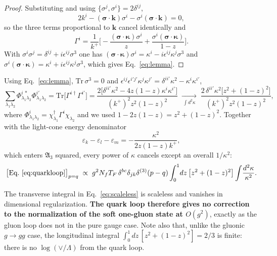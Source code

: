 \documentclass[11pt]{article}
\newcommand{\mf}{\mathfrak}
\newcommand{\eps}{\varepsilon}
\newcommand{\dg}{\dagger}
\newcommand{\dthree}{\delta^{(3)}}
\begin{document}
\begin{proof}[Proof]
Substituting and using $\{\sigma^{j},\sigma^{i}\}=2\delta^{ij}$,
\begin{equation}
2k^{i}-(\bm\sigma\!\cdot\!\bm k)\sigma^{i}-\sigma^{i}(\bm\sigma\!\cdot\!\bm k)=0,
\end{equation}
so the three terms proportional to $\bm k$ cancel identically and
\begin{equation}
\Gamma^{i}=\frac{1}{k^{+}}\Big[-\frac{(\bm\sigma\!\cdot\!\bm\kappa)\sigma^{i}}{z}
+\frac{\sigma^{i}(\bm\sigma\!\cdot\!\bm\kappa)}{1-z}\Big].
\end{equation}
With $\sigma^{i}\sigma^{j}=\delta^{ij}+i\epsilon^{ij}\sigma^{3}$ one has
$(\bm\sigma\!\cdot\!\bm\kappa)\sigma^{i}=\kappa^{i}-i\epsilon^{ij}\kappa^{j}\sigma^{3}$ and
$\sigma^{i}(\bm\sigma\!\cdot\!\bm\kappa)=\kappa^{i}+i\epsilon^{ij}\kappa^{j}\sigma^{3}$, which
gives Eq.~\eqref{eq:lemma}.
\end{proof}

\noindent
Using Eq.~\eqref{eq:lemma}, $\mathrm{Tr}\,\sigma^{3}=0$ and
$\epsilon^{ij}\epsilon^{i'j'}\kappa^{j}\kappa^{j'}=\delta^{ii'}\kappa^{2}-\kappa^{i}\kappa^{i'}$,
\begin{equation}
\sum_{\lambda_{1}\lambda_{2}}\Phi^{i\,*}_{\lambda_1\lambda_2}\Phi^{i'}_{\lambda_1\lambda_2}
=\mathrm{Tr}\big[\Gamma^{i\dg}\Gamma^{i'}\big]
=\frac{2\big[\delta^{ii'}\kappa^{2}-4z(1-z)\kappa^{i}\kappa^{i'}\big]}{(k^{+})^{2}z^{2}(1-z)^{2}}
\;\xrightarrow[\ \int d^{2}\kappa\ ]{}\;
\frac{2\,\delta^{ii'}\kappa^{2}\big[z^{2}+(1-z)^{2}\big]}{(k^{+})^{2}z^{2}(1-z)^{2}},
\end{equation}
where $\Phi^{i}_{\lambda_1\lambda_2}=\chi^{\dg}_{\lambda_1}\Gamma^{i}\chi_{\lambda_2}$ and we used
$1-2z(1-z)=z^{2}+(1-z)^{2}$. Together with the light-cone energy denominator
\begin{equation}
\eps_{k}-\eps_{l}-\eps_{m}=-\frac{\kappa^{2}}{2z(1-z)k^{+}},
\end{equation}
which enters $\mf A_{3}$ squared, every power of $\kappa$ cancels except an overall $1/\kappa^{2}$:
\begin{equation}
\big[\text{Eq.}~\eqref{eq:quarkloop}\big]_{p=q}
\;\propto\;g^{2}N_{f}T_{F}\,\delta^{bc}\delta_{jk}\dthree(p-q)
\int_{0}^{1}\!dz\,\big[z^{2}+(1-z)^{2}\big]\int\!\frac{d^{2}\kappa}{\kappa^{2}} .
\label{eq:scaleless}
\end{equation}

\begin{res}
The transverse integral in Eq.~\eqref{eq:scaleless} is scaleless and vanishes in dimensional
regularization. \textbf{The quark loop therefore gives no correction to the normalization of the
soft one-gluon state at $O(g^{2})$}, exactly as the gluon loop does not in the pure gauge case.
Note also that, unlike the gluonic $g\to gg$ case, the longitudinal integral
$\int_{0}^{1}dz\,[z^{2}+(1-z)^{2}]=2/3$ is finite: there is no $\log(\vee/\Lambda)$ from the
quark loop.
\end{res}
\end{document}
